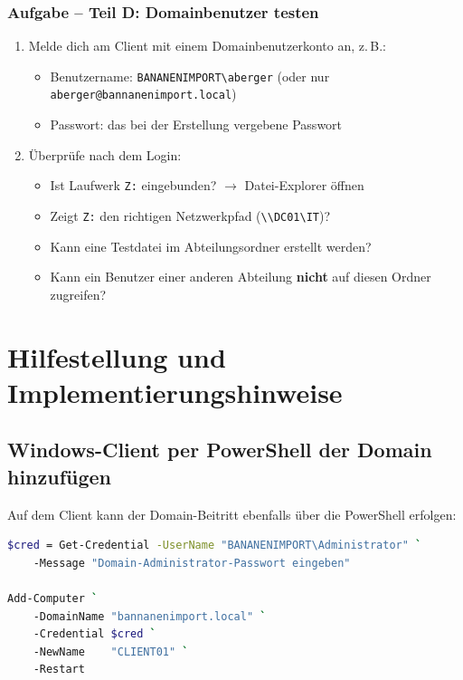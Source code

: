 \documentclass[11pt, oneside, numbers=noenddot]{scrbook}
\begin{document}
\subsection*{Aufgabe -- Teil D: Domainbenutzer testen}
\begin{enumerate}
  \item Melde dich am Client mit einem Domainbenutzerkonto an, z.\,B.:
  \begin{itemize}
    \item Benutzername: \texttt{BANANENIMPORT\textbackslash aberger} (oder nur \texttt{aberger@bannanenimport.local})
    \item Passwort: das bei der Erstellung vergebene Passwort
  \end{itemize}
  \item Überprüfe nach dem Login:
  \begin{itemize}
    \item Ist Laufwerk \texttt{Z:} eingebunden? $\rightarrow$ Datei-Explorer öffnen
    \item Zeigt \texttt{Z:} den richtigen Netzwerkpfad (\texttt{\textbackslash\textbackslash DC01\textbackslash IT})?
    \item Kann eine Testdatei im Abteilungsordner erstellt werden?
    \item Kann ein Benutzer einer anderen Abteilung \textbf{nicht} auf diesen Ordner zugreifen?
  \end{itemize}
\end{enumerate}



\chapter{Hilfestellung und Implementierungshinweise}


\section{Windows-Client per PowerShell der Domain hinzufügen}
Auf dem Client kann der Domain-Beitritt ebenfalls über die PowerShell erfolgen:

\begin{lstlisting}[language=sh, caption=Domain-Beitritt per PowerShell]
$cred = Get-Credential -UserName "BANANENIMPORT\Administrator" `
    -Message "Domain-Administrator-Passwort eingeben"

Add-Computer `
    -DomainName "bannanenimport.local" `
    -Credential $cred `
    -NewName    "CLIENT01" `
    -Restart
\end{lstlisting}
\end{document}
